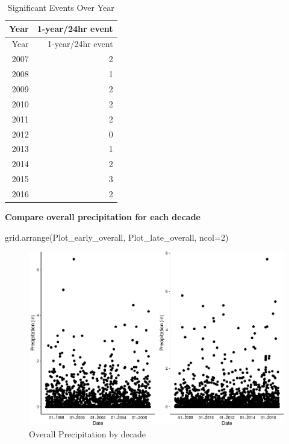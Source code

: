 \documentclass[
  12pt,
]{article}
\newenvironment{Shaded}{\begin{snugshade}}{\end{snugshade}}
\newcommand{\AttributeTok}[1]{\textcolor[rgb]{0.77,0.63,0.00}{#1}}
\newcommand{\DecValTok}[1]{\textcolor[rgb]{0.00,0.00,0.81}{#1}}
\newcommand{\FunctionTok}[1]{\textcolor[rgb]{0.00,0.00,0.00}{#1}}
\newcommand{\NormalTok}[1]{#1}
\begin{document}
\begin{longtable}[]{@{}rr@{}}
\caption{Significant Events Over Year}\tabularnewline
\toprule
Year & 1-year/24hr event \\
\midrule
\endfirsthead
\toprule
Year & 1-year/24hr event \\
\midrule
\endhead
2007 & 2 \\
2008 & 1 \\
2009 & 2 \\
2010 & 2 \\
2011 & 2 \\
2012 & 0 \\
2013 & 1 \\
2014 & 2 \\
2015 & 3 \\
2016 & 2 \\
\bottomrule
\end{longtable}

\textbf{Compare overall precipitation for each decade}

\begin{Shaded}
\begin{Highlighting}[]
\FunctionTok{grid.arrange}\NormalTok{(Plot\_early\_overall, Plot\_late\_overall, }\AttributeTok{ncol=}\DecValTok{2}\NormalTok{)}
\end{Highlighting}
\end{Shaded}

\begin{figure}

{\centering \includegraphics{Final_Project_Thornton_Katayama_Ngenzi_files/figure-latex/overall grid-1} 

}

\caption{Overall Precipitation by decade}\label{fig:overall grid}
\end{figure}
\end{document}
